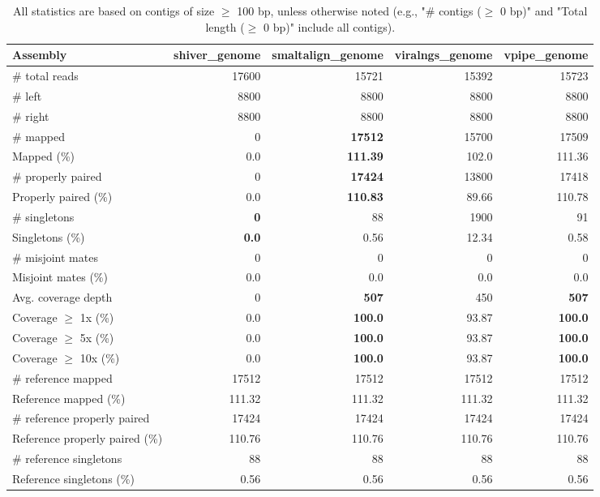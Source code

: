 \documentclass[12pt,a4paper]{article}
\begin{document}
\begin{table}[ht]
\begin{center}
\caption{All statistics are based on contigs of size $\geq$ 100 bp, unless otherwise noted (e.g., "\# contigs ($\geq$ 0 bp)" and "Total length ($\geq$ 0 bp)" include all contigs).}
\begin{tabular}{|l*{4}{|r}|}
\hline
Assembly & shiver\_genome & smaltalign\_genome & viralngs\_genome & vpipe\_genome \\ \hline
\# total reads & 17600 & 15721 & 15392 & 15723 \\ \hline
\# left & 8800 & 8800 & 8800 & 8800 \\ \hline
\# right & 8800 & 8800 & 8800 & 8800 \\ \hline
\# mapped & 0 & {\bf 17512} & 15700 & 17509 \\ \hline
Mapped (\%) & 0.0 & {\bf 111.39} & 102.0 & 111.36 \\ \hline
\# properly paired & 0 & {\bf 17424} & 13800 & 17418 \\ \hline
Properly paired (\%) & 0.0 & {\bf 110.83} & 89.66 & 110.78 \\ \hline
\# singletons & {\bf 0} & 88 & 1900 & 91 \\ \hline
Singletons (\%) & {\bf 0.0} & 0.56 & 12.34 & 0.58 \\ \hline
\# misjoint mates & 0 & 0 & 0 & 0 \\ \hline
Misjoint mates (\%) & 0.0 & 0.0 & 0.0 & 0.0 \\ \hline
Avg. coverage depth & 0 & {\bf 507} & 450 & {\bf 507} \\ \hline
Coverage $\geq$ 1x (\%) & 0.0 & {\bf 100.0} & 93.87 & {\bf 100.0} \\ \hline
Coverage $\geq$ 5x (\%) & 0.0 & {\bf 100.0} & 93.87 & {\bf 100.0} \\ \hline
Coverage $\geq$ 10x (\%) & 0.0 & {\bf 100.0} & 93.87 & {\bf 100.0} \\ \hline
\# reference mapped & 17512 & 17512 & 17512 & 17512 \\ \hline
Reference mapped (\%) & 111.32 & 111.32 & 111.32 & 111.32 \\ \hline
\# reference properly paired & 17424 & 17424 & 17424 & 17424 \\ \hline
Reference properly paired (\%) & 110.76 & 110.76 & 110.76 & 110.76 \\ \hline
\# reference singletons & 88 & 88 & 88 & 88 \\ \hline
Reference singletons (\%) & 0.56 & 0.56 & 0.56 & 0.56 \\ \hline

\end{tabular}
\end{center}
\end{table}
\end{document}
